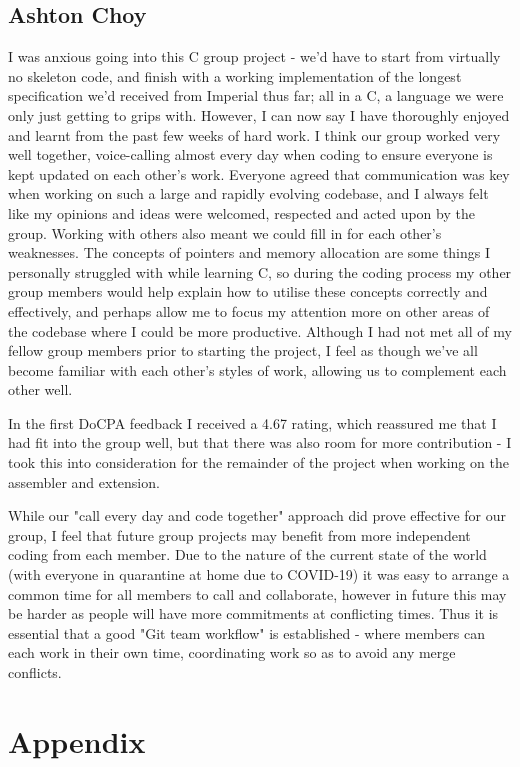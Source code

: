 \documentclass[11pt]{article}
\begin{document}
\subsection*{Ashton Choy}
I was anxious going into this C group project - we'd have to start from virtually no skeleton code, and finish with a working implementation of the longest specification we'd received from Imperial thus far; all in a C, a language we were only just getting to grips with. However, I can now say I have thoroughly enjoyed and learnt from the past few weeks of hard work. I think our group worked very well together, voice-calling almost every day when coding to ensure everyone is kept updated on each other's work. Everyone agreed that communication was key when working on such a large and rapidly evolving codebase, and I always felt like my opinions and ideas were welcomed, respected and acted upon by the group. Working with others also meant we could fill in for each other's weaknesses. The concepts of pointers and memory allocation are some things I personally struggled with while learning C, so during the coding process my other group members would help explain how to utilise these concepts correctly and effectively, and perhaps allow me to focus my attention more on other areas of the codebase where I could be more productive. Although I had not met all of my fellow group members prior to starting the project, I feel as though we've all become familiar with each other's styles of work, allowing us to complement each other well.

In the first DoCPA feedback I received a 4.67 rating, which reassured me that I had fit into the group well, but that there was also room for more contribution - I took this into consideration for the remainder of the project when working on the assembler and extension. 

While our "call every day and code together" approach did prove effective for our group, I feel that future group projects may benefit from more independent coding from each member. Due to the nature of the current state of the world (with everyone in quarantine at home due to COVID-19) it was easy to arrange a common time for all members to call and collaborate, however in future this may be harder as people will have more commitments at conflicting times. Thus it is essential that a good "Git team workflow" is established - where members can each work in their own time, coordinating work so as to avoid any merge conflicts.

\appendix
\section*{Appendix}
\end{document}
